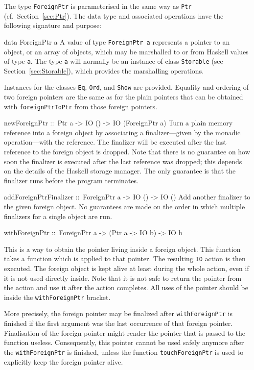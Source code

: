 \documentclass[a4paper,twoside]{article}
\makeatletter
\newcommand{\code}[1]{\texttt{#1}}      %
\newenvironment{codedesc}{%
  \list{}{\labelwidth\z@
    \let\makelabel\codedesclabel}
  }{%
  \endlist
  }
\newcommand*{\codedesclabel}[1]{%
  \hspace{-\leftmargin}
  \parbox[b]{\labelwidth}{\makebox[0pt][l]{\code{#1}}\\}\hfil\relax
  }
\makeatother
\begin{document}
The type \code{ForeignPtr} is parameterised in the same way as \code{Ptr}
(cf.\ Section~\ref{sec:Ptr}).  The data type and associated operations have
the following signature and purpose:
%
\begin{codedesc}
\item[data ForeignPtr a] A value of type \code{ForeignPtr a} represents a
  pointer to an object, or an array of objects, which may be marshalled to or
  from Haskell values of type \code{a}.  The type \code{a} will normally be an
  instance of class \code{Storable} (see Section~\ref{sec:Storable}), which
  provides the marshalling operations.
  
  Instances for the classes \code{Eq}, \code{Ord}, and \code{Show} are
  provided.  Equality and ordering of two foreign pointers are the same as for
  the plain pointers that can be obtained with \code{foreignPtrToPtr} from
  those foreign pointers.
  
\item[newForeignPtr ::\ Ptr a -> IO () -> IO (ForeignPtr a)] Turn a plain
  memory reference into a foreign object by associating a finalizer---given by
  the monadic operation---with the reference. The finalizer will be executed
  after the last reference to the foreign object is dropped. Note that there
  is no guarantee on how soon the finalizer is executed after the last
  reference was dropped; this depends on the details of the Haskell storage
  manager. The only guarantee is that the finalizer runs before the program
  terminates.  
  
\item[addForeignPtrFinalizer ::\ ForeignPtr a -> IO () -> IO ()] Add another
  finalizer to the given foreign object. No guarantees are made on the order
  in which multiple finalizers for a single object are run.

\item[withForeignPtr ::\ ForeignPtr a -> (Ptr a -> IO b) -> IO b]
  
  This is a way to obtain the pointer living inside a foreign object. This
  function takes a function which is applied to that pointer. The resulting
  \code{IO} action is then executed. The foreign object is kept alive at least
  during the whole action, even if it is not used directly inside. Note that
  it is not safe to return the pointer from the action and use it after the
  action completes.  All uses of the pointer should be inside the
  \code{withForeignPtr} bracket.

  More precisely, the foreign pointer may be finalized after
  \code{withForeignPtr} is finished if the first argument was the last
  occurrence of that foreign pointer.  Finalisation of the foreign pointer
  might render the pointer that is passed to the function useless.
  Consequently, this pointer cannot be used safely anymore after the
  \code{withForeignPtr} is finished, unless the function
  \code{touchForeignPtr} is used to explicitly keep the foreign pointer alive.
  

\end{codedesc}
\end{document}
